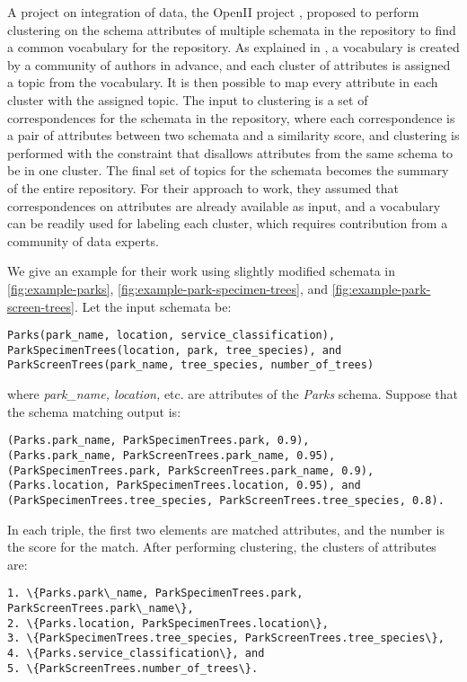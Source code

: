 A project on integration of data, the OpenII project \cite{Smith2011Unity}, proposed to perform clustering on the schema attributes of multiple schemata in the repository to find a common vocabulary for the repository. As explained in \cite{Smith2011Unity}, a vocabulary is created by a community of authors in advance, and each cluster of attributes is assigned a topic from the vocabulary. It is then possible to map every attribute in each cluster with the assigned topic. The input to clustering is a set of correspondences for the schemata in the repository, where each correspondence is a pair of attributes between two schemata and a similarity score, and clustering is performed with the constraint that disallows attributes from the same schema to be in one cluster. The final set of topics for the schemata becomes the summary of the entire repository. For their approach to work, they assumed that correspondences on attributes are already available as input, and a vocabulary can be readily used for labeling each cluster, which requires contribution from a community of data experts.

We give an example for their work using slightly modified schemata in \autoref{fig:example-parks}, \autoref{fig:example-park-specimen-trees}, and \autoref{fig:example-park-screen-trees}. Let the input schemata be:

\begin{lstlisting}
Parks(park_name, location, service_classification),
ParkSpecimenTrees(location, park, tree_species), and
ParkScreenTrees(park_name, tree_species, number_of_trees)
\end{lstlisting}

where \textit{park\_name, location,} etc. are attributes of the \textit{Parks} schema. Suppose that the schema matching output is:

\begin{lstlisting}
(Parks.park_name, ParkSpecimenTrees.park, 0.9),
(Parks.park_name, ParkScreenTrees.park_name, 0.95),
(ParkSpecimenTrees.park, ParkScreenTrees.park_name, 0.9),
(Parks.location, ParkSpecimenTrees.location, 0.95), and
(ParkSpecimenTrees.tree_species, ParkScreenTrees.tree_species, 0.8).
\end{lstlisting}

In each triple, the first two elements are matched attributes, and the number is the score for the match. After performing clustering, the clusters of attributes are:
\begin{lstlisting}
1. \{Parks.park\_name, ParkSpecimenTrees.park, ParkScreenTrees.park\_name\},
2. \{Parks.location, ParkSpecimenTrees.location\},
3. \{ParkSpecimenTrees.tree_species, ParkScreenTrees.tree_species\},
4. \{Parks.service_classification\}, and
5. \{ParkScreenTrees.number_of_trees\}.
\end{lstlisting}

